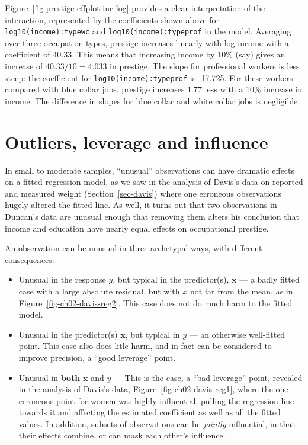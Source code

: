 \documentclass[
  letterpaper,
  10pt,
  krantz2]{krantz}
\begin{document}
Figure~\ref{fig-prestige-effplot-inc-log} provides a clear
interpretation of the interaction, represented by the coefficients shown
above for \texttt{log10(income):typewc} and
\texttt{log10(income):typeprof} in the model. Averaging over three
occupation types, prestige increases linearly with log income with a
coefficient of 40.33. This means that increasing income by 10\% (say)
gives an increase of \(40.33 / 10 = 4.033\) in prestige. The slope for
professional workers is less steep: the coefficient for
\texttt{log10(income):typeprof} is -17.725. For these workers compared
with blue collar jobs, prestige increases 1.77 less with a 10\% increase
in income. The difference in slopes for blue collar and white collar
jobs is negligible.

\section{Outliers, leverage and influence}\label{sec-leverage}

In small to moderate samples, ``unusual'' observations can have dramatic
effects on a fitted regression model, as we saw in the analysis of
Davis's data on reported and measured weight (Section~\ref{sec-davis})
where one erroneous observations hugely altered the fitted line. As
well, it turns out that two observations in Duncan's data are unusual
enough that removing them alters his conclusion that income and
education have nearly equal effects on occupational prestige.

An observation can be unusual in three archetypal ways, with different
consequences:

\begin{itemize}
\item
  Unusual in the response \(y\), but typical in the predictor(s),
  \(\mathbf{x}\) --- a badly fitted case with a large absolute residual,
  but with \(x\) not far from the mean, as in
  Figure~\ref{fig-ch02-davis-reg2}. This case does not do much harm to
  the fitted model.
\item
  Unusual in the predictor(s) \(\mathbf{x}\), but typical in \(y\) ---
  an otherwise well-fitted point. This case also does litle harm, and in
  fact can be considered to improve precision, a ``good leverage''
  point.
\item
  Unusual in \textbf{both} \(\mathbf{x}\) and \(y\) --- This is the
  case, a ``bad leverage'' point, revealed in the analysis of Davis's
  data, Figure~\ref{fig-ch02-davis-reg1}, where the one erroneous point
  for women was highly influential, pulling the regression line towards
  it and affecting the estimated coefficient as well as all the fitted
  values. In addition, subsets of observations can be \emph{jointly}
  influential, in that their effects combine, or can mask each other's
  influence.
\end{itemize}
\end{document}
